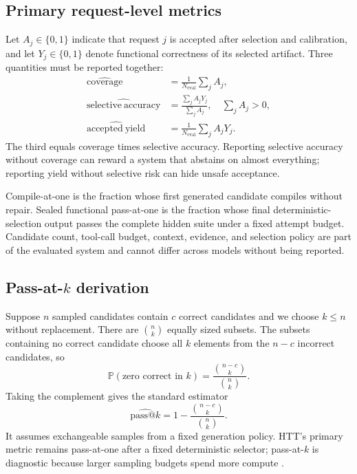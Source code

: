 \documentclass[10pt,letterpaper]{article}
\newcommand{\Prob}{\mathbb{P}}
\newcommand{\1}{\mathbb{1}}
\begin{document}
\subsection{Primary request-level metrics}

Let $A_j\in\{0,1\}$ indicate that request $j$ is accepted after selection and calibration, and let
$Y_j\in\{0,1\}$ denote functional correctness of its selected artifact.  Three quantities must be
reported together:
\begin{align}
  \widehat{\mathrm{coverage}}
  &=\frac{1}{N_{\mathrm{eval}}}\sum_jA_j,\\
  \widehat{\mathrm{selective\ accuracy}}
  &=\frac{\sum_jA_jY_j}{\sum_jA_j},
  \quad\sum_jA_j>0,\\
  \widehat{\mathrm{accepted\ yield}}
  &=\frac{1}{N_{\mathrm{eval}}}\sum_jA_jY_j.
  \label{eq:accepted-metrics}
\end{align}
The third equals coverage times selective accuracy.  Reporting selective accuracy without coverage
can reward a system that abstains on almost everything; reporting yield without selective risk can
hide unsafe acceptance.

Compile-at-one is the fraction whose first generated candidate compiles without repair.  Sealed
functional pass-at-one is the fraction whose final deterministic-selection output passes the complete
hidden suite under a fixed attempt budget.  Candidate count, tool-call budget, context, evidence, and
selection policy are part of the evaluated system and cannot differ across models without being
reported.

\subsection{Pass-at-$k$ derivation}

Suppose $n$ sampled candidates contain $c$ correct candidates and we choose $k\le n$ without
replacement.  There are $\binom nk$ equally sized subsets.  The subsets containing no correct
candidate choose all $k$ elements from the $n-c$ incorrect candidates, so
\begin{equation}
  \Prob(\text{zero correct in }k)=\frac{\binom{n-c}{k}}{\binom nk}.
\end{equation}
Taking the complement gives the standard estimator
\begin{equation}
  \widehat{\mathrm{pass@}k}
  =1-\frac{\binom{n-c}{k}}{\binom nk}.
  \label{eq:pass-at-k}
\end{equation}
It assumes exchangeable samples from a fixed generation policy.  HTT's primary metric remains
pass-at-one after a fixed deterministic selector; pass-at-$k$ is diagnostic because larger sampling
budgets spend more compute \cite{chen2021humaneval}.
\end{document}
